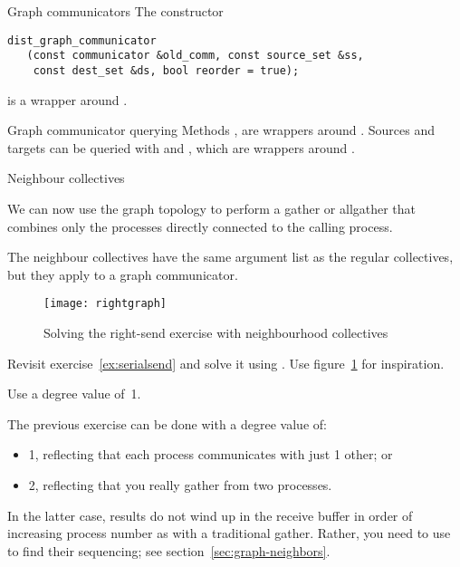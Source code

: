 \begin{mplnote}{Graph communicators}
  \label{mpl:graph-comm}
  The constructor 
\begin{lstlisting}
dist_graph_communicator
   (const communicator &old_comm, const source_set &ss,
    const dest_set &ds, bool reorder = true);    
\end{lstlisting}
is a wrapper around .
\end{mplnote}
\begin{mplnote}{Graph communicator querying}
  \label{mpl:graph-query}
  Methods , 
  are wrappers around .
  Sources and targets can be queried with
   and ,
  which are wrappers around .
\end{mplnote}

 {Neighbour collectives}

We can now use the graph topology to perform a gather or allgather
that combines only the processes directly connected to the calling
process.

The neighbour collectives have the same argument list as the regular
collectives, but they apply to a graph communicator.

\begin{figure}[ht]
  \texttt{[image: rightgraph]}
  \caption{Solving the right-send exercise with neighbourhood
    collectives}
  \label{fig:rightgraph}
\end{figure}

\begin{exercise}
  \label{ex:rightgraph}
  Revisit exercise~\ref{ex:serialsend} and solve it using
  .
  Use figure~\ref{fig:rightgraph} for inspiration.

  Use a degree value of~1.
\end{exercise}

The previous exercise can be done with a degree value of:
\begin{itemize}
\item 1, reflecting that each process communicates with just 1 other; or
\item 2, reflecting that you really gather from two processes.
\end{itemize}
In the latter case, results do not wind up in the receive buffer
in order of increasing process number as with a traditional gather.
Rather, you need to use~
to find their sequencing; see section~\ref{sec:graph-neighbors}.

